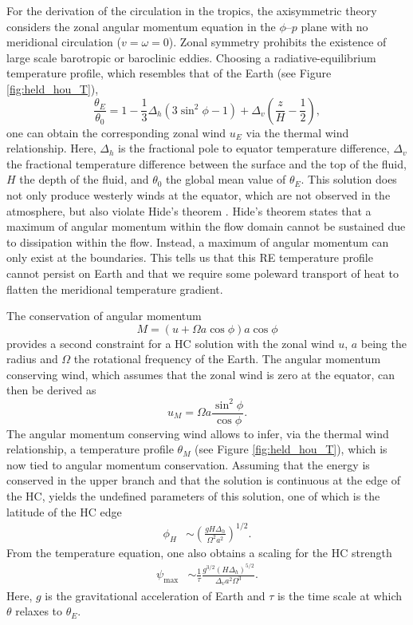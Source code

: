 For the derivation of the circulation in the tropics, the axisymmetric theory considers the zonal angular momentum equation in the $\phi$--$p$ plane with no meridional circulation ($v=\omega=0$). Zonal symmetry prohibits the existence of large scale barotropic or baroclinic eddies. Choosing a radiative-equilibrium temperature profile, which resembles that of the Earth (see Figure \ref{fig:held_hou_T}),
\begin{equation}
    \frac{\theta_E}{\theta_0}=1-\frac{1}{3}\Delta_h(3\sin^2\phi-1)+\Delta_v\left(\frac{z}{H}-\frac{1}{2}\right),
\end{equation}
one can obtain the corresponding zonal wind $u_E$ via the thermal wind relationship. Here, $\Delta_h$ is the fractional pole to equator temperature difference, $\Delta_v$ the fractional temperature difference between the surface and the top of the fluid, $H$ the depth of the fluid, and $\theta_0$ the global mean value of $\theta_E$. This solution does not only produce westerly winds at the equator, which are not observed in the atmosphere, but also violate Hide's theorem \parencite{hideDynamicsAtmospheresMajor1969}. Hide's theorem states that a maximum of angular momentum within the flow domain cannot be sustained due to dissipation within the flow. Instead, a maximum of angular momentum can only exist at the boundaries. This tells us that this RE temperature profile cannot persist on Earth and that we require some poleward transport of heat to flatten the meridional temperature gradient.

The conservation of angular momentum
\begin{equation}
    M=(u+\Omega a\cos\phi)a\cos\phi
\end{equation}
provides a second constraint for a HC solution with the zonal wind $u$, $a$ being the radius and $\Omega$ the rotational frequency of the Earth. The angular momentum conserving wind, which assumes that the zonal wind is zero at the equator, can then be derived as
\begin{equation}
    u_M=\Omega a\frac{\sin^2\phi}{\cos\phi}.
\end{equation}
The angular momentum conserving wind allows to infer, via the thermal wind relationship, a temperature profile $\theta_M$ (see Figure \ref{fig:held_hou_T}), which is now tied to angular momentum conservation. Assuming that the energy is conserved in the upper branch and that the solution is continuous at the edge of the HC, yields the undefined parameters of this solution, one of which is the latitude of the HC edge 
\begin{align}\label{eq:HH_ext}
    \phi_H&\sim\left(\frac{gH\Delta_h}{\Omega^2a^2}\right)^{1/2}.
\end{align}
From the temperature equation, one also obtains a scaling for the HC strength
\begin{align}\label{eq:HH_strength}
    \psi_\mathrm{max} &\sim \frac{1}{\tau}\frac{g^{3/2}(H\Delta_h)^{5/2}}{\Delta_v a^2\Omega^3}.
\end{align}
Here, $g$ is the gravitational acceleration of Earth and $\tau$ is the time scale at which $\theta$ relaxes to $\theta_E$.

